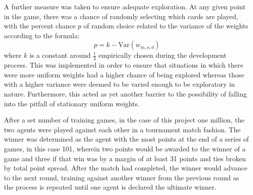 \newcommand{\Var}{\mathrm{Var}}
A further measure was taken to ensure adequate exploration.
%
At any given point in the game,
there was a chance of randomly selecting which cards are played,
with the percent chance $p$ of random choice related to the variance of the 
weights according to the formula:
\[
	p = k - \Var(w_{m,o,d})
\]
where $k$ is a constant around $\frac{1}{3}$ empirically chosen during the
development process.
%
This was implemented in order to ensure that situations in which there were
more uniform weights had a higher chance of being explored
whereas those with a higher variance were deemed to be varied enough to be
exploratory in nature.
%
Furthermore, this acted as yet another barrier to the possibility of falling
into the pitfall of stationary uniform weights.

After a set number of training games,
in the case of this project one million,
the two agents were played against each other in a tournament match fashion.
%
The winner was determined as the agent with the most points at the end
of a series of games, %
in this case 101, %
wherein two points would be awarded to the winner of a game and three if that
win was by a margin of at least 31 points
and ties broken by total point spread.
%
After the match had completed,
the winner would advance to the next round,
training against another winner from the previous round as the process is
repeated until one agent is declared the ultimate winner.

